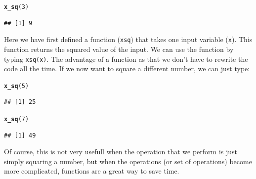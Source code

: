 \documentclass{article}\usepackage[]{graphicx}\usepackage[]{color}
\makeatletter
\newcommand{\hlnum}[1]{\textcolor[rgb]{0.686,0.059,0.569}{#1}}%
\newcommand{\hlstd}[1]{\textcolor[rgb]{0.345,0.345,0.345}{#1}}%
\newcommand{\hlkwd}[1]{\textcolor[rgb]{0.737,0.353,0.396}{\textbf{#1}}}%
\newenvironment{kframe}{%
 \def\at@end@of@kframe{}%
 \ifinner\ifhmode%
  \def\at@end@of@kframe{\end{minipage}}%
  \begin{minipage}{\columnwidth}%
 \fi\fi%
 \def\FrameCommand##1{\hskip\@totalleftmargin \hskip-\fboxsep
 \colorbox{shadecolor}{##1}\hskip-\fboxsep
     \hskip-\linewidth \hskip-\@totalleftmargin \hskip\columnwidth}%
 \MakeFramed {\advance\hsize-\width
   \@totalleftmargin\z@ \linewidth\hsize
   \@setminipage}}%
 {\par\unskip\endMakeFramed%
 \at@end@of@kframe}
\newenvironment{knitrout}{}{} %
\makeatother
\begin{document}
\begin{mdframed}
\begin{knitrout}
\begin{kframe}
\begin{alltt}
\hlkwd{x_sq}\hlstd{(}\hlnum{3}\hlstd{)}
\end{alltt}
\begin{verbatim}
## [1] 9
\end{verbatim}
\end{kframe}
\end{knitrout}
Here we have first defined a function (\texttt{x\textunderscore sq}) that takes one input variable (\texttt{x}). This function returns the squared value of the input. We can use the function by typing \texttt{x\textunderscore sq(x)}. The advantage of a function as that we don't have to rewrite the code all the time. If we now want to square a different number, we can just type:
\begin{knitrout}
\color{fgcolor}\begin{kframe}
\begin{alltt}
\hlkwd{x_sq}\hlstd{(}\hlnum{5}\hlstd{)}
\end{alltt}
\begin{verbatim}
## [1] 25
\end{verbatim}
\begin{alltt}
\hlkwd{x_sq}\hlstd{(}\hlnum{7}\hlstd{)}
\end{alltt}
\begin{verbatim}
## [1] 49
\end{verbatim}
\end{kframe}
\end{knitrout}
Of course, this is not very usefull when the operation that we perform is just simply squaring a number, but when the operations (or set of operations) become more complicated, functions are a great way to save time.


\end{mdframed}
\end{document}
